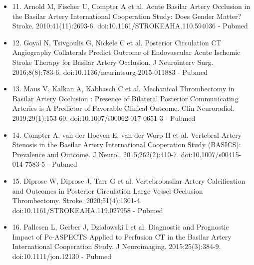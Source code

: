 {\begin{itemize}
		\item
		11. Arnold M, Fischer U, Compter A et al. Acute Basilar Artery Occlusion in the Basilar Artery International Cooperation Study: Does Gender Matter? Stroke. 2010;41(11):2693-6. doi:10.1161/STROKEAHA.110.594036 - Pubmed
		\item
		12. Goyal N, Tsivgoulis G, Nickele C et al. Posterior Circulation CT Angiography Collaterals Predict Outcome of Endovascular Acute Ischemic Stroke Therapy for Basilar Artery Occlusion. J Neurointerv Surg. 2016;8(8):783-6. doi:10.1136/neurintsurg-2015-011883 - Pubmed
		\item
		13. Maus V, Kalkan A, Kabbasch C et al. Mechanical Thrombectomy in Basilar Artery Occlusion : Presence of Bilateral Posterior Communicating Arteries is A Predictor of Favorable Clinical Outcome. Clin Neuroradiol. 2019;29(1):153-60. doi:10.1007/s00062-017-0651-3 - Pubmed
		\item
		14. Compter A, van der Hoeven E, van der Worp H et al. Vertebral Artery Stenosis in the Basilar Artery International Cooperation Study (BASICS): Prevalence and Outcome. J Neurol. 2015;262(2):410-7. doi:10.1007/s00415-014-7583-5 - Pubmed
		\item
		15. Diprose W, Diprose J, Tarr G et al. Vertebrobasilar Artery Calcification and Outcomes in Posterior Circulation Large Vessel Occlusion Thrombectomy. Stroke. 2020;51(4):1301-4. doi:10.1161/STROKEAHA.119.027958 - Pubmed
		\item
		16. Pallesen L, Gerber J, Dzialowski I et al. Diagnostic and Prognostic Impact of Pc-ASPECTS Applied to Perfusion CT in the Basilar Artery International Cooperation Study. J Neuroimaging. 2015;25(3):384-9. doi:10.1111/jon.12130 - Pubmed
\end{itemize}}